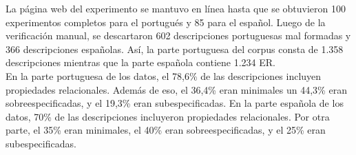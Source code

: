 

La p\'agina web del experimento se mantuvo en l\'{i}nea hasta que se obtuvieron 100 experimentos completos para el portugu\'es y 85  para el espa\~nol. Luego de la verificaci\'on manual, se descartaron 602 descripciones portuguesas mal formadas y 366 descripciones espa\~nolas. As\'{i}, la parte portuguesa del corpus consta de 1.358 descripciones mientras que la parte espa\~nola contiene 1.234 ER.\\ 

En la parte portuguesa de los datos, el 78,6\% de las descripciones incluyen propiedades relacionales. Adem\'as de eso, el 36,4\% eran minimales un 44,3\% eran sobreespecificadas, y el 19,3\% eran subespecificadas. En la parte espa\~nola de los datos, 70\% de las descripciones incluyeron propiedades relacionales. Por otra parte, el 35\% eran minimales, el 40\% eran sobreespecificadas, y el 25\% eran subespecificadas.\\

